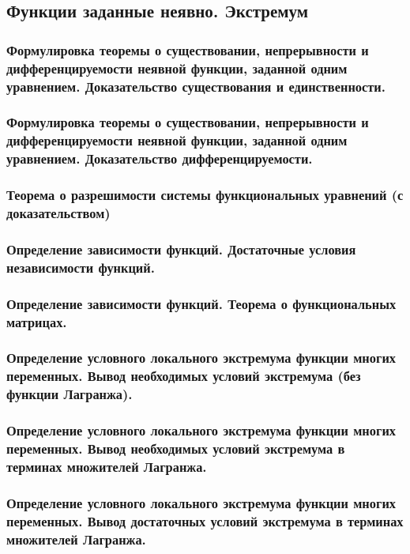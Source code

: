 \documentclass[10pt]{article}
\begin{document}
    \subsection{Функции заданные неявно. Экстремум}
    \subsubsection{Формулировка теоремы о существовании, непрерывности и дифференцируемости неявной функции, заданной одним уравнением. Доказательство существования и единственности.}
    \subsubsection{Формулировка теоремы о существовании, непрерывности и дифференцируемости неявной функции, заданной одним уравнением. Доказательство дифференцируемости.}
    \subsubsection{Теорема о разрешимости системы функциональных уравнений (с доказательством)}
    \subsubsection{Определение зависимости функций. Достаточные условия независимости функций.}
    \subsubsection{Определение зависимости функций. Теорема о функциональных матрицах.}
    \subsubsection{Определение условного локального экстремума функции многих переменных. Вывод необходимых условий экстремума (без функции Лагранжа).}
    \subsubsection{Определение условного локального экстремума функции многих переменных. Вывод необходимых условий экстремума в терминах множителей Лагранжа.}
    \subsubsection{Определение условного локального экстремума функции многих переменных. Вывод достаточных условий экстремума в терминах множителей Лагранжа.}
\end{document}
